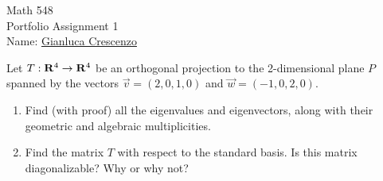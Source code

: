 \documentclass[10pt,twoside,openany]{memoir}
\begin{document}
\begin{center}
    {\Large Math 548 \\[0.1in]Portfolio Assignment 1}\\[.175in]
    {Name:} {\underline{Gianluca Crescenzo\hspace*{2in}}}\\[0.15in]
    \end{center}
    \vspace{4pt}
\begin{problem}[S24, P5]
Let $T:\mathbf{R}^4 \rightarrow \mathbf{R}^4$ be an orthogonal projection to the 2-dimensional plane $P$ spanned by the vectors $\vec{v} = (2,0,1,0)$ and $\vec{w} = (-1,0,2,0)$.
    \begin{enumerate}[label = (\alph*),itemsep=1pt,topsep=3pt]
        \item Find (with proof) all the eigenvalues and eigenvectors, along with their geometric and algebraic multiplicities.
        \item Find the matrix $T$ with respect to the standard basis. Is this matrix diagonalizable? Why or why not?
    \end{enumerate}
\end{problem}
\end{document}

